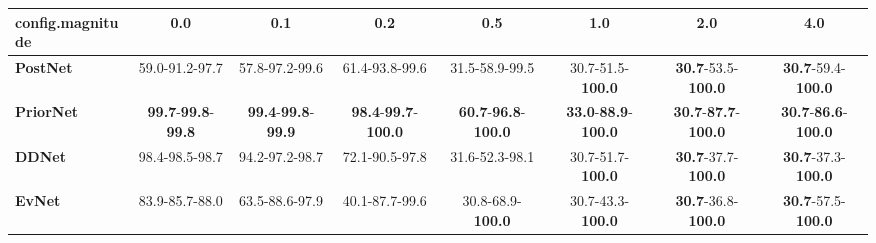 \begin{tabular}{lccccccc}
\toprule
\textbf{config.magnitude} &                                        0.0 &                                        0.1 &                                         0.2 &                                         0.5 &                                         1.0 &                                         2.0 &                                         4.0 \\
\midrule
\textbf{PostNet } &                             59.0-91.2-97.7 &                             57.8-97.2-99.6 &                              61.4-93.8-99.6 &                              31.5-58.9-99.5 &                    30.7-51.5-\textbf{100.0} &           \textbf{30.7}-53.5-\textbf{100.0} &           \textbf{30.7}-59.4-\textbf{100.0} \\
\textbf{PriorNet} &  \textbf{99.7}-\textbf{99.8}-\textbf{99.8} &  \textbf{99.4}-\textbf{99.8}-\textbf{99.9} &  \textbf{98.4}-\textbf{99.7}-\textbf{100.0} &  \textbf{60.7}-\textbf{96.8}-\textbf{100.0} &  \textbf{33.0}-\textbf{88.9}-\textbf{100.0} &  \textbf{30.7}-\textbf{87.7}-\textbf{100.0} &  \textbf{30.7}-\textbf{86.6}-\textbf{100.0} \\
\textbf{DDNet   } &                             98.4-98.5-98.7 &                             94.2-97.2-98.7 &                              72.1-90.5-97.8 &                              31.6-52.3-98.1 &                    30.7-51.7-\textbf{100.0} &           \textbf{30.7}-37.7-\textbf{100.0} &           \textbf{30.7}-37.3-\textbf{100.0} \\
\textbf{EvNet   } &                             83.9-85.7-88.0 &                             63.5-88.6-97.9 &                              40.1-87.7-99.6 &                    30.8-68.9-\textbf{100.0} &                    30.7-43.3-\textbf{100.0} &           \textbf{30.7}-36.8-\textbf{100.0} &           \textbf{30.7}-57.5-\textbf{100.0} \\
\bottomrule
\end{tabular}
